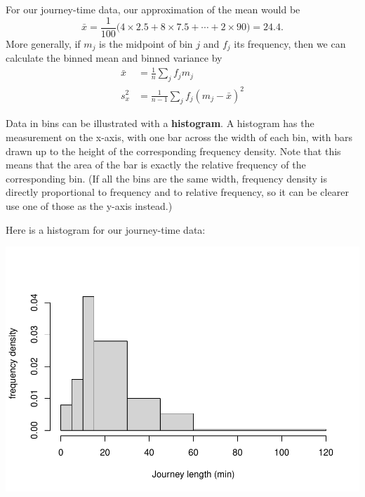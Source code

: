 \documentclass[
  a4paper,
]{book}
\newenvironment{Shaded}{\begin{snugshade}}{\end{snugshade}}
\newcommand{\AttributeTok}[1]{\textcolor[rgb]{0.77,0.63,0.00}{#1}}
\newcommand{\DecValTok}[1]{\textcolor[rgb]{0.00,0.00,0.81}{#1}}
\newcommand{\FunctionTok}[1]{\textcolor[rgb]{0.00,0.00,0.00}{#1}}
\newcommand{\NormalTok}[1]{#1}
\newcommand{\OtherTok}[1]{\textcolor[rgb]{0.56,0.35,0.01}{#1}}
\newcommand{\SpecialCharTok}[1]{\textcolor[rgb]{0.00,0.00,0.00}{#1}}
\newcommand{\StringTok}[1]{\textcolor[rgb]{0.31,0.60,0.02}{#1}}
\theoremstyle{definition}
\theoremstyle{definition}
\theoremstyle{definition}
\theoremstyle{definition}
\theoremstyle{remark}
\begin{document}
For our journey-time data, our approximation of the mean would be
\[ \bar x = \frac{1}{100} \big(4\times 2.5 + 8 \times 7.5 + \cdots + 2\times90) = 24.4 . \]
More generally, if \(m_j\) is the midpoint of bin \(j\) and \(f_j\) its frequency, then we can calculate the binned mean and binned variance by
\begin{align*}
  \bar x &= \frac{1}{n} \sum_j f_j m_j \\
  s^2_x  &= \frac{1}{n-1} \sum_j f_j (m_j - \bar x)^2
\end{align*}

Data in bins can be illustrated with a \textbf{histogram}. A histogram has the measurement on the x-axis, with one bar across the width of each bin, with bars drawn up to the height of the corresponding frequency density. Note that this means that the area of the bar is exactly the relative frequency of the corresponding bin. (If all the bins are the same width, frequency density is directly proportional to frequency and to relative frequency, so it can be clearer use one of those as the y-axis instead.)

Here is a histogram for our journey-time data:

\begin{Shaded}
\end{Shaded}

\includegraphics{math1710_files/figure-latex/journeys-1.pdf}
\end{document}
